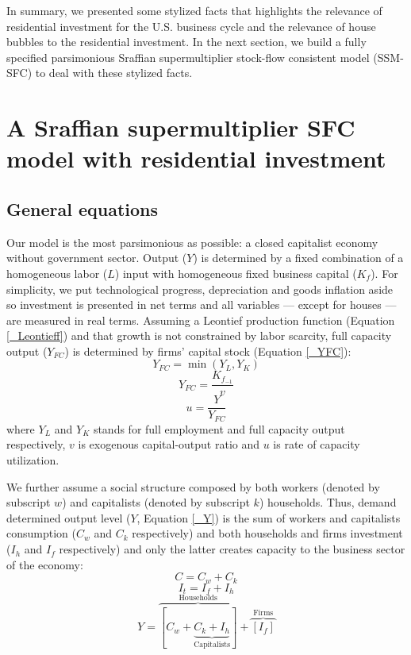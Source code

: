\documentclass[12pt, a4]{article}
\begin{document}
In summary, we presented some stylized facts that highlights the relevance of residential investment for the U.S. business cycle and the relevance of house bubbles to the residential investment.
In the next section, we build a fully specified parsimonious Sraffian supermultiplier stock-flow consistent model (SSM-SFC) to deal with these stylized facts.


\section{A Sraffian supermultiplier SFC model with residential investment}
\label{sec:org20e7c23}
\label{sec:Model}
\subsection{General equations}
\label{sec:orgfcd0451}

Our model is the most parsimonious as possible: a closed capitalist economy without government sector. Output (\(Y\)) is determined by  a fixed combination of a homogeneous labor (\(L\)) input with homogeneous fixed business capital (\(K_f\)). 
For simplicity, we put technological progress, depreciation and goods inflation aside so investment is presented in net terms and all variables --- except for houses --- are measured in real terms.
Assuming a Leontief production function (Equation \ref{_Leontieff}) and that growth is not constrained by labor scarcity, full capacity output (\(Y_{FC}\)) is
determined by firms' capital stock (Equation \ref{_YFC}):
\begin{equation}
\label{_Leontieff}
    Y_{FC} = \min (Y_L, Y_K)
\end{equation}
\begin{equation}
\label{_YFC}
    Y_{FC} = \frac{K_{f_{-1}}}{v}
\end{equation}
\begin{equation}
\label{_u}
    u = \frac{Y}{Y_{FC}}
\end{equation}
where \(Y_L\) and \(Y_K\) stands for full employment and full capacity output respectively, \(v\) is exogenous capital-output ratio and \(u\) is rate of capacity utilization.

We further assume a social structure composed by both workers (denoted by subscript \(w\)) and capitalists (denoted by subscript \(k\)) households.
Thus, demand determined output level (\(Y\), Equation \ref{_Y})  is the sum of workers and capitalists consumption (\(C_w\) and \(C_k\) respectively) and both households and firms investment (\(I_h\) and \(I_f\) respectively) and only the latter creates capacity to the business sector of the economy:
\begin{equation}
\label{_Ct}
    C = C_w + C_k
\end{equation}
\begin{equation}
\label{_It}
    I_t = I_f + I_h
\end{equation}
\begin{equation}
\label{_Y}
    Y = \overbrace{[C_w + \underbrace{C_k + I_h}_{\text{Capitalists}}]}^{\text{Households}} + \overbrace{[I_f]}^{\text{Firms}}
\end{equation}
\end{document}
